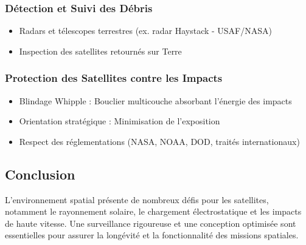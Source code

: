 \subsubsection{Détection et Suivi des Débris}
\begin{itemize}
    \item Radars et télescopes terrestres (ex. radar Haystack - USAF/NASA)
    \item Inspection des satellites retournés sur Terre
\end{itemize}

\subsubsection{Protection des Satellites contre les Impacts}
\begin{itemize}
    \item Blindage Whipple : Bouclier multicouche absorbant l’énergie des impacts
    \item Orientation stratégique : Minimisation de l’exposition
    \item Respect des réglementations (NASA, NOAA, DOD, traités internationaux)
\end{itemize}

\subsection{Conclusion}
L’environnement spatial présente de nombreux défis pour les satellites, notamment le rayonnement solaire, le chargement électrostatique et les impacts de haute vitesse. Une surveillance rigoureuse et une conception optimisée sont essentielles pour assurer la longévité et la fonctionnalité des missions spatiales.

